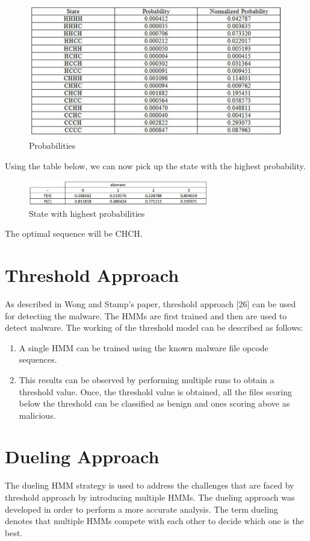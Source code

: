 \begin{figure}
\includegraphics[width=1.0\textwidth]{images/prob.jpg}
\caption{Probabilities} 
\label{table:Probabilities}
\end{figure}
\break

Using the table below, we can now pick up the state with the highest probability.

\begin{figure}
\includegraphics[width=0.7\textwidth]{images/prob2.jpg}
\caption{State with highest probabilities} 
\label{table: with highest probabilities}
\end{figure}
\break

The optimal sequence will be CHCH.

\section{Threshold Approach}
As described in Wong and Stamp\rq s paper, threshold approach [26] can be used for detecting the malware. The HMMs are first trained and then are used to detect malware. The working of the threshold model can be described as follows:
\begin{enumerate}
\item A single HMM can be trained using the known malware file opcode sequences.
\item This results can be observed by performing multiple runs to obtain a threshold value. Once, the threshold value is obtained, all the files scoring below the threshold can be classified as benign and ones scoring above as malicious.
\end{enumerate}

\section{Dueling Approach}
The dueling HMM strategy is used to address the challenges that are faced by threshold approach by introducing multiple HMMs. The dueling approach was developed in order to perform a more accurate analysis. The term dueling denotes that multiple HMMs compete with each other to decide which one is the best. 

